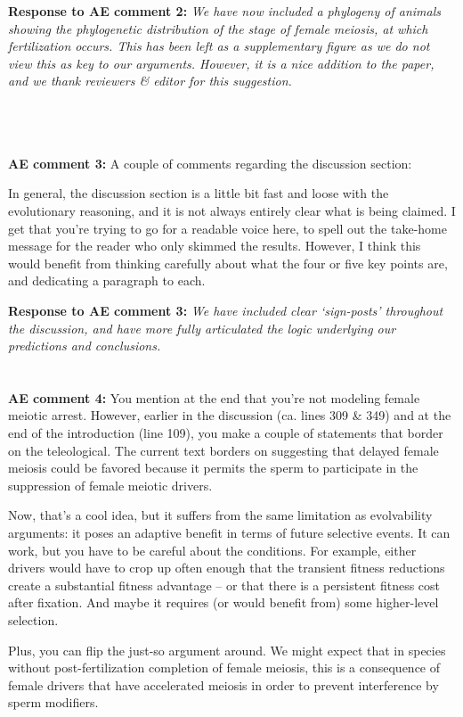 \documentclass[12pt,letterpaper]{article}
\newcommand{\gc}[1]{{ \color{red} #1}}
\begin{document}
{\bf{Response to AE comment 2:}}  \emph{\gc{We have now included a phylogeny of animals showing the phylogenetic distribution of the stage of female meiosis, at which fertilization occurs. This has been left as a supplementary figure as we do not view this as key to our arguments. However, it is a nice addition to the paper, and we thank reviewers \& editor for this suggestion. }}

\\
\\
\\
{\bf{AE comment 3:}} 
A couple of comments regarding the discussion section:

In general, the discussion section is a little bit fast and loose with the evolutionary reasoning, and it is not always entirely clear what is being claimed. I get that you're trying to go for a readable voice here, to spell out the take-home message for the reader who only skimmed the results. However, I think this would benefit from thinking carefully about what the four or five key points are, and dedicating a paragraph to each.

{\bf{Response to AE comment 3:}}  \emph{We have included clear `sign-posts' throughout the discussion, and have more fully articulated the logic underlying our predictions and conclusions.}
\\
\\
\\
{\bf{AE comment 4:}} 
You mention at the end that you're not modeling female meiotic arrest. However, earlier in the discussion (ca. lines 309 \& 349) and at the end of the introduction (line 109), you make a couple of statements that border on the teleological. The current text borders on suggesting that delayed female meiosis could be favored because it permits the sperm to participate in the suppression of female meiotic drivers.

Now, that's a cool idea, but it suffers from the same limitation as evolvability arguments: it poses an adaptive benefit in terms of future selective events. It can work, but you have to be careful about the conditions. For example, either drivers would have to crop up often enough that the transient fitness reductions create a substantial fitness advantage -- or that there is a persistent fitness cost after fixation. And maybe it requires (or would benefit from) some higher-level selection.

Plus, you can flip the just-so argument around. We might expect that in species without post-fertilization completion of female meiosis, this is a consequence of female drivers that have accelerated meiosis in order to prevent interference by sperm modifiers.
\end{document}
